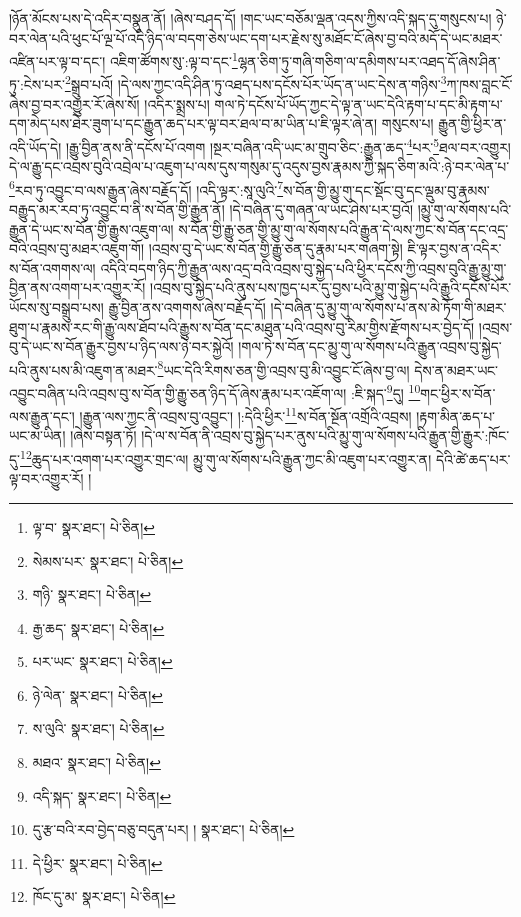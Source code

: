 །ཉོན་མོངས་པས་དེ་འདིར་བསྣུན་ནོ། །ཞེས་བཤད་དོ། །གང་ཡང་བཅོམ་ལྡན་འདས་ཀྱིས་འདི་སྐད་དུ་གསུངས་པ། ཉེ་བར་ལེན་པའི་ཕུང་པོ་ལྔ་པོ་འདི་ཉིད་ལ་བདག་ཅེས་ཡང་དག་པར་རྗེས་སུ་མཐོང་ངོ་ཞེས་བྱ་བའི་མདོ་དེ་ཡང་མཐར་འཛིན་པར་ལྟ་བ་དང་། འཇིག་ཚོགས་སུ་:ལྟ་བ་དང་\footnote{ལྟ་བ་  སྣར་ཐང་།  པེ་ཅིན། }ལྷན་ཅིག་ཏུ་གཞི་གཅིག་ལ་དམིགས་པར་འཐད་དོ་ཞེས་ཤིན་ཏུ་:ངེས་པར་\footnote{སེམས་པར་  སྣར་ཐང་།  པེ་ཅིན། }སྒྲུབ་པའོ། །དེ་ལས་ཀྱང་འདི་ཤིན་ཏུ་འཐད་པས་དངོས་པོར་ཡོད་ན་ཡང་དེས་ན་གཉིས་\footnote{གཉི་  སྣར་ཐང་།  པེ་ཅིན། }ཀ་ཁས་བླང་ངོ་ཞེས་བྱ་བར་འགྱུར་རོ་ཞེས་སོ། །འདིར་སྨྲས་པ། གལ་ཏེ་དངོས་པོ་ཡོད་ཀྱང་དེ་ལྟ་ན་ཡང་དེའི་རྟག་པ་དང་མི་རྟག་པ་དག་མེད་པས་ཐེར་ཟུག་པ་དང་རྒྱུན་ཆད་པར་ལྟ་བར་ཐལ་བ་མ་ཡིན་པ་ཇི་ལྟར་ཞེ་ན། གསུངས་པ། རྒྱུན་གྱི་ཕྱིར་ན་འདི་ཡོད་དེ། །རྒྱུ་བྱིན་ནས་ནི་དངོས་པོ་འགག །སྔར་བཞིན་འདི་ཡང་མ་གྲུབ་ཅིང་:རྒྱུན་ཆད་\footnote{རྒྱ་ཆད་  སྣར་ཐང་།  པེ་ཅིན། }པར་\footnote{པར་ཡང་  སྣར་ཐང་།  པེ་ཅིན། }ཐལ་བར་འགྱུར། དེ་ལ་རྒྱུ་དང་འབྲས་བུའི་འབྲེལ་པ་འཇུག་པ་ལས་དུས་གསུམ་དུ་འདུས་བྱས་རྣམས་ཀྱི་སྐད་ཅིག་མའི་:ཉེ་བར་ལེན་པ་\footnote{ཉེ་ལེན་  སྣར་ཐང་།  པེ་ཅིན། }རབ་ཏུ་འབྱུང་བ་ལས་རྒྱུན་ཞེས་བརྗོད་དོ། །འདི་ལྟར་:སཱ་ལུའི་\footnote{ས་ལུའི་  སྣར་ཐང་།  པེ་ཅིན། }ས་བོན་གྱི་མྱུ་གུ་དང་སྡོང་བུ་དང་ལྡུམ་བུ་རྣམས་བརྒྱུད་མར་རབ་ཏུ་འབྱུང་བ་ནི་ས་བོན་གྱི་རྒྱུན་ནོ། །དེ་བཞིན་དུ་གཞན་ལ་ཡང་ཤེས་པར་བྱའོ། །མྱུ་གུ་ལ་སོགས་པའི་རྒྱུན་དེ་ཡང་ས་བོན་གྱི་རྒྱུས་འཇུག་ལ། ས་བོན་གྱི་རྒྱུ་ཅན་གྱི་མྱུ་གུ་ལ་སོགས་པའི་རྒྱུན་དེ་ལས་ཀྱང་ས་བོན་དང་འདྲ་བའི་འབྲས་བུ་མཐར་འཇུག་གོ། །འབྲས་བུ་དེ་ཡང་ས་བོན་གྱི་རྒྱུ་ཅན་དུ་རྣམ་པར་གཞག་སྟེ། ཇི་ལྟར་བྱས་ན་འདིར་ས་བོན་འགགས་ལ། འདིའི་བདག་ཉིད་ཀྱི་རྒྱུན་ལས་འདྲ་བའི་འབྲས་བུ་སྐྱེད་པའི་ཕྱིར་དངོས་ཀྱི་འབྲས་བུའི་རྒྱུ་མྱུ་གུ་བྱིན་ནས་འགག་པར་འགྱུར་རོ། །འབྲས་བུ་སྐྱེད་པའི་ནུས་པས་ཁྱད་པར་དུ་བྱས་པའི་མྱུ་གུ་སྐྱེད་པའི་རྒྱུའི་དངོས་པོར་ཡོངས་སུ་བསྒྲུབ་པས། རྒྱུ་བྱིན་ནས་འགགས་ཞེས་བརྗོད་དོ། །དེ་བཞིན་དུ་མྱུ་གུ་ལ་སོགས་པ་ནས་མེ་ཏོག་གི་མཐར་ཐུག་པ་རྣམས་རང་གི་རྒྱུ་ལས་ཐོབ་པའི་རྒྱུས་ས་བོན་དང་མཐུན་པའི་འབྲས་བུ་རིམ་གྱིས་རྫོགས་པར་བྱེད་དོ། །འབྲས་བུ་དེ་ཡང་ས་བོན་རྒྱུར་བྱས་པ་ཉིད་ལས་ཉེ་བར་སྐྱེའོ། །གལ་ཏེ་ས་བོན་དང་མྱུ་གུ་ལ་སོགས་པའི་རྒྱུན་འབྲས་བུ་སྐྱེད་པའི་ནུས་པས་མི་འཇུག་ན་མཐར་\footnote{མཐའ་  སྣར་ཐང་།  པེ་ཅིན། }ཡང་དེའི་རིགས་ཅན་གྱི་འབྲས་བུ་མི་འབྱུང་ངོ་ཞེས་བྱ་ལ། དེས་ན་མཐར་ཡང་འབྱུང་བཞིན་པའི་འབྲས་བུ་ས་བོན་གྱི་རྒྱུ་ཅན་ཉིད་དོ་ཞེས་རྣམ་པར་འཇོག་ལ། :ཇི་སྐད་\footnote{འདི་སྐད་  སྣར་ཐང་།  པེ་ཅིན། }དུ། \footnote{དུ་རྩ་བའི་རབ་བྱེད་བཅུ་བདུན་པར། །   སྣར་ཐང་།  པེ་ཅིན། }གང་ཕྱིར་ས་བོན་ལས་རྒྱུན་དང་། །རྒྱུན་ལས་ཀྱང་ནི་འབྲས་བུ་འབྱུང་། །:དེའི་ཕྱིར་\footnote{དེ་ཕྱིར་  སྣར་ཐང་།  པེ་ཅིན། }ས་བོན་སྔོན་འགྲོའི་འབྲས། །རྟག་མིན་ཆད་པ་ཡང་མ་ཡིན། །ཞེས་བསྟན་ཏོ། །དེ་ལ་ས་བོན་ནི་འབྲས་བུ་སྐྱེད་པར་ནུས་པའི་མྱུ་གུ་ལ་སོགས་པའི་རྒྱུན་གྱི་རྒྱུར་:ཁོང་དུ་\footnote{ཁོང་དུ་མ་  སྣར་ཐང་།  པེ་ཅིན། }ཆུད་པར་འགག་པར་འགྱུར་གྲང་ལ། མྱུ་གུ་ལ་སོགས་པའི་རྒྱུན་ཀྱང་མི་འཇུག་པར་འགྱུར་ན། དེའི་ཚེ་ཆད་པར་ལྟ་བར་འགྱུར་རོ། །
